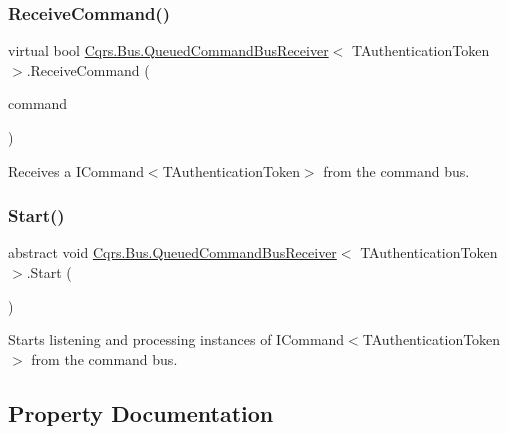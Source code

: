 \subsubsection{\texorpdfstring{Receive\+Command()}{ReceiveCommand()}}
{\footnotesize\ttfamily virtual bool \hyperlink{classCqrs_1_1Bus_1_1QueuedCommandBusReceiver}{Cqrs.\+Bus.\+Queued\+Command\+Bus\+Receiver}$<$ T\+Authentication\+Token $>$.Receive\+Command (\begin{DoxyParamCaption}\item[{\hyperlink{interfaceCqrs_1_1Commands_1_1ICommand}{I\+Command}$<$ T\+Authentication\+Token $>$}]{command }\end{DoxyParamCaption})\hspace{0.3cm}{\ttfamily [virtual]}}



Receives a I\+Command$<$\+T\+Authentication\+Token$>$ from the command bus. 

\mbox{\label{classCqrs_1_1Bus_1_1QueuedCommandBusReceiver_ad8bf3c1f9d9b0444cb85784cb9e59823_ad8bf3c1f9d9b0444cb85784cb9e59823}} 
\subsubsection{\texorpdfstring{Start()}{Start()}}
{\footnotesize\ttfamily abstract void \hyperlink{classCqrs_1_1Bus_1_1QueuedCommandBusReceiver}{Cqrs.\+Bus.\+Queued\+Command\+Bus\+Receiver}$<$ T\+Authentication\+Token $>$.Start (\begin{DoxyParamCaption}{ }\end{DoxyParamCaption})\hspace{0.3cm}{\ttfamily [pure virtual]}}



Starts listening and processing instances of I\+Command$<$\+T\+Authentication\+Token$>$ from the command bus. 



\subsection{Property Documentation}
\mbox{\label{classCqrs_1_1Bus_1_1QueuedCommandBusReceiver_a809cb92ece6c52bbbe3abc347be0470d_a809cb92ece6c52bbbe3abc347be0470d}} 
